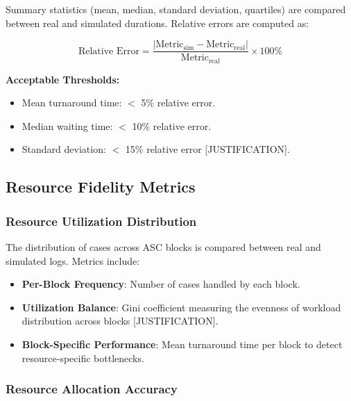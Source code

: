         Summary statistics (mean, median, standard deviation, quartiles) are compared between real and simulated durations. Relative errors are computed as:
        
        \begin{equation}
            \text{Relative Error} = \frac{|\text{Metric}_{\text{sim}} - \text{Metric}_{\text{real}}|}{\text{Metric}_{\text{real}}} \times 100\%
        \end{equation}
        
        \textbf{Acceptable Thresholds:}
        
        \begin{itemize}
            \item Mean turnaround time: $<$ 5\% relative error.
            \item Median waiting time: $<$ 10\% relative error.
            \item Standard deviation: $<$ 15\% relative error [JUSTIFICATION].
        \end{itemize}
        
    \subsection{Resource Fidelity Metrics}

        \subsubsection{Resource Utilization Distribution}
        
        The distribution of cases across ASC blocks is compared between real and simulated logs. Metrics include:
        
        \begin{itemize}
            \item \textbf{Per-Block Frequency}: Number of cases handled by each block.
            \item \textbf{Utilization Balance}: Gini coefficient measuring the evenness of workload distribution across blocks [JUSTIFICATION].
            \item \textbf{Block-Specific Performance}: Mean turnaround time per block to detect resource-specific bottlenecks.
        \end{itemize}

        \subsubsection{Resource Allocation Accuracy}
        
